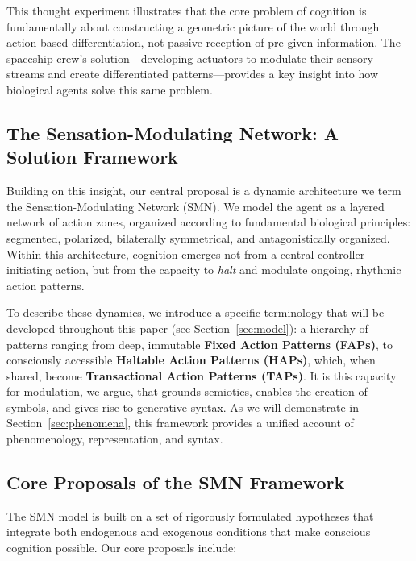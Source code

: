 This thought experiment illustrates that the core problem of cognition is fundamentally about constructing a geometric picture of the world through action-based differentiation, not passive reception of pre-given information. The spaceship crew's solution—developing actuators to modulate their sensory streams and create differentiated patterns—provides a key insight into how biological agents solve this same problem.

\subsection{The Sensation-Modulating Network: A Solution Framework}
Building on this insight, our central proposal is a dynamic architecture we term the Sensation-Modulating Network (SMN). We model the agent as a layered network of action zones, organized according to fundamental biological principles: segmented, polarized, bilaterally symmetrical, and antagonistically organized. Within this architecture, cognition emerges not from a central controller initiating action, but from the capacity to \textit{halt} and modulate ongoing, rhythmic action patterns. 

To describe these dynamics, we introduce a specific terminology that will be developed throughout this paper (see Section~\ref{sec:model}): a hierarchy of patterns ranging from deep, immutable \textbf{Fixed Action Patterns (FAPs)}, to consciously accessible \textbf{Haltable Action Patterns (HAPs)}, which, when shared, become \textbf{Transactional Action Patterns (TAPs)}. It is this capacity for modulation, we argue, that grounds semiotics\cite{peirce1992essential}, enables the creation of symbols, and gives rise to generative syntax\cite{chomsky1965aspects}. As we will demonstrate in Section~\ref{sec:phenomena}, this framework provides a unified account of phenomenology, representation, and syntax.

\subsection{Core Proposals of the SMN Framework}
The SMN model is built on a set of rigorously formulated hypotheses that integrate both endogenous and exogenous conditions that make conscious cognition possible. Our core proposals include:

